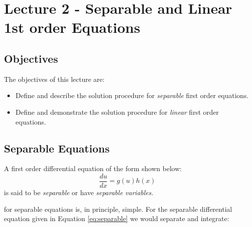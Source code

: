 \chapter{Lecture 2 - Separable and Linear 1st order Equations}
\label{ch:lec2}
\section{Objectives}
The objectives of this lecture are:
\begin{itemize}
\item Define and describe the solution procedure for \emph{separable} first order equations.
\item Define and demonstrate the solution procedure for \emph{linear} first order equations.
\end{itemize}

\section{Separable Equations} 
A first order differential equation of the form shown below:
\begin{equation}
\frac{du}{dx} = g(u)h(x)
\label{eq:separable}
\end{equation}
is said to be \emph{separable} or have \emph{separable variables.} 

 for separable equations is, in principle, simple.  For the separable differential equation given in Equation \ref{eq:separable} we would separate and integrate:


